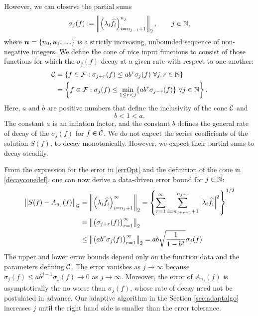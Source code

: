 \documentclass[graybox,footinfo]{svmult}
\newcommand{\DHJRnorm}[2][{}]{\ensuremath{\left \lVert #2 \right \rVert}_{#1}}
\newcommand{\DHJRabs}[1]{\ensuremath{{\left \lvert #1 \right \rvert}}}
\begin{document}
However, we can observe the partial sums 
\begin{equation} \label{sumdef}
\sigma_j(f) :
= \DHJRnorm[2]{ \left(\lambda_{i} \widehat{f}_{i} \right)_{i=n_{j-1}+1}^{n_j}}, \qquad j \in \bbN,
\end{equation}
where ${\boldsymbol{n}}  = \{n_0, n_1, \ldots\}$ is a strictly increasing, unbounded sequence of non-negative integers.  We define the cone of nice input functions to consist of those functions for which the $\sigma_j(f)$ decay at a given rate with respect to one another:
\begin{align} \label{decayconedef}
\calC &= \left\{ f \in \calF : \sigma_{j+r}(f) \le ab^r \sigma_j (f) \ \forall j,r \in \bbN \right\} \\
\nonumber
& = \left\{ f \in \calF : \sigma_j(f) \le \min_{1 \le r < j}\{ab^r\sigma_{j-r}(f)\} \ \forall j \in \bbN \right\}.
\end{align}
Here, $a$ and $b$ are positive numbers that define the inclusivity of the cone ${\mathcal{C}}$ and 
\begin{equation} \label{abcond}
b <1 < a.
\end{equation}
The constant $a$ is an inflation factor, and the constant $b$ defines the general rate of decay of the $\sigma_j(f)$ for $f \in {\mathcal{C}}$. We do not expect the series coefficients of the solution $S(f)$, to decay monotonically. However, we expect their partial sums to decay steadily.

From the expression for the error in \eqref{errOpt} and the definition of the cone in  \eqref{decayconedef}, one can now derive a data-driven error bound for $j \in {\mathbb{N}}$:
\begin{align}
\nonumber
\DHJRnorm[\calG]{S(f)-A_{n_j}(f)} &= \DHJRnorm[2]{\left(\lambda_{i} \widehat{f}_{i} \right)_{i = n_j+1}^\infty} = \left\{\sum_{r=1}^\infty \sum_{i=n_{j+r-1}+1}^{n_{j+r}}  \DHJRabs{\lambda_{i}\widehat{f}_{i} }^{2}  \right\}^{1/2}\\
\nonumber
&= \DHJRnorm[2]{ \bigl(\sigma_{j+r}(f)\bigr)_{r=1}^{\infty}} \\
&\le \DHJRnorm[2]{ \bigl(ab^r\sigma_{j}(f)\bigr)_{r=1}^{\infty}}
 = \displaystyle ab \sqrt{\frac{1}{1 - b^2}}\sigma_{j}(f)
 \label{algoineq}
\end{align}
The upper and lower error bounds depend only on the function data and the parameters defining ${\mathcal{C}}$.  The error vanishes as $j \to \infty$ because $\sigma_j(f) \le ab^{j-1} \sigma_1(f) \to 0$ as $j \to \infty$.  Moreover, the error of $A_{n_j}(f)$ is asymptotically the no worse than $\sigma_j(f)$, whose rate of decay need not be postulated in advance. Our adaptive algorithm in the Section \ref{sec:adaptalgo} increases $j$ until the right hand side is smaller than the error tolerance.
\end{document}
